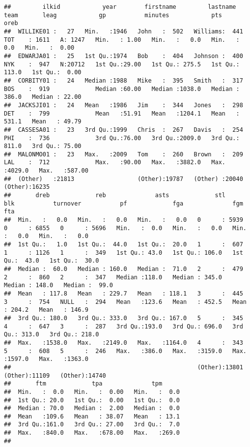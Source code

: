 \documentclass[
]{book}
\begin{document}
\begin{verbatim}
##         ilkid            year        firstname         lastname          team       leag            gp           minutes            pts              oreb       
##  WILLIKE01 :   27   Min.   :1946   John   :  502   Williams:  441   TOT    : 1611   A: 1247   Min.   : 1.00   Min.   :   0.0   Min.   :   0.0   Min.   :  0.00  
##  EDWARJA01 :   25   1st Qu.:1974   Bob    :  404   Johnson :  400   NYK    :  947   N:20712   1st Qu.:29.00   1st Qu.: 275.5   1st Qu.: 113.0   1st Qu.:  0.00  
##  CORBITY01 :   24   Median :1988   Mike   :  395   Smith   :  317   BOS    :  919             Median :60.00   Median :1038.0   Median : 386.0   Median : 22.00  
##  JACKSJI01 :   24   Mean   :1986   Jim    :  344   Jones   :  298   DET    :  799             Mean   :51.91   Mean   :1204.1   Mean   : 531.1   Mean   : 49.79  
##  CASSESA01 :   23   3rd Qu.:1999   Chris  :  267   Davis   :  254   PHI    :  736             3rd Qu.:76.00   3rd Qu.:2009.0   3rd Qu.: 811.0   3rd Qu.: 75.00  
##  MALONMO01 :   23   Max.   :2009   Tom    :  260   Brown   :  209   LAL    :  712             Max.   :90.00   Max.   :3882.0   Max.   :4029.0   Max.   :587.00  
##  (Other)   :21813                  (Other):19787   (Other) :20040   (Other):16235                                                                               
##       dreb             reb              asts             stl             blk           turnover           pf             fga              fgm              fta        
##  Min.   :   0.0   Min.   :   0.0   Min.   :   0.0   0      : 5939   0      : 6855   0      : 5696   Min.   :  0.0   Min.   :   0.0   Min.   :   0.0   Min.   :   0.0  
##  1st Qu.:   1.0   1st Qu.:  44.0   1st Qu.:  20.0   1      :  607   1      : 1126   1      :  349   1st Qu.: 43.0   1st Qu.: 106.0   1st Qu.:  43.0   1st Qu.:  30.0  
##  Median :  60.0   Median : 160.0   Median :  71.0   2      :  479   2      :  860   2      :  347   Median :118.0   Median : 345.0   Median : 148.0   Median :  99.0  
##  Mean   : 117.8   Mean   : 229.7   Mean   : 118.1   3      :  445   3      :  754   NULL   :  294   Mean   :123.6   Mean   : 452.5   Mean   : 204.2   Mean   : 146.9  
##  3rd Qu.: 180.0   3rd Qu.: 333.0   3rd Qu.: 167.0   5      :  345   4      :  647   3      :  287   3rd Qu.:193.0   3rd Qu.: 696.0   3rd Qu.: 313.0   3rd Qu.: 218.0  
##  Max.   :1538.0   Max.   :2149.0   Max.   :1164.0   4      :  343   5      :  608   5      :  246   Max.   :386.0   Max.   :3159.0   Max.   :1597.0   Max.   :1363.0  
##                                                     (Other):13801   (Other):11109   (Other):14740                                                                     
##       ftm             tpa              tpm       
##  Min.   :  0.0   Min.   :  0.00   Min.   :  0.0  
##  1st Qu.: 20.0   1st Qu.:  0.00   1st Qu.:  0.0  
##  Median : 70.0   Median :  2.00   Median :  0.0  
##  Mean   :109.6   Mean   : 38.07   Mean   : 13.1  
##  3rd Qu.:161.0   3rd Qu.: 27.00   3rd Qu.:  7.0  
##  Max.   :840.0   Max.   :678.00   Max.   :269.0  
## 
\end{verbatim}
\end{document}
